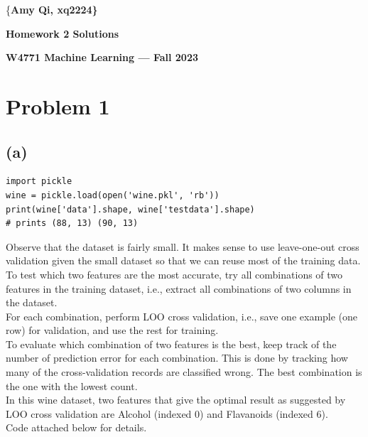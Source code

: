 \documentclass[11pt]{article}
\begin{document}
\centerline{\{\bf Amy Qi, xq2224\}}
\centerline{\bf Homework 2 Solutions}
\centerline{\bf W4771 Machine Learning --- Fall 2023}

\bigskip 
\bigskip

\section*{Problem 1}
\subsection*{(a)}
\begin{verbatim}
import pickle
wine = pickle.load(open('wine.pkl', 'rb'))
print(wine['data'].shape, wine['testdata'].shape)
# prints (88, 13) (90, 13)
\end{verbatim}
Observe that the dataset is fairly small. It makes sense to use leave-one-out cross validation given the small dataset so that we can reuse most of the training data. \\
To test which two features are the most accurate, try all combinations of two features in the training dataset, i.e., extract all combinations of two columns in the dataset. \\
For each combination, perform LOO cross validation, i.e., save one example (one row) for validation, and use the rest for training. \\
To evaluate which combination of two features is the best, keep track of the number of prediction error for each combination. This is done by tracking how many of the cross-validation records are classified wrong. The best combination is the one with the lowest count. \\
In this wine dataset, two features that give the optimal result as suggested by LOO cross validation are Alcohol (indexed 0) and Flavanoids (indexed 6). \\
Code attached below for details.
\end{document}
